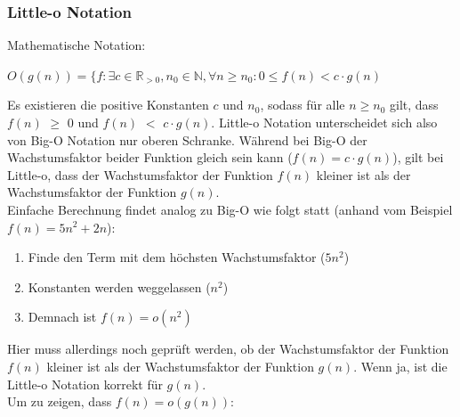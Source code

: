 \documentclass[
../AuD-Zusammenfassung.tex,
]
{subfiles}
\begin{document}
\newpage
\subsubsection{Little-o Notation}
Mathematische Notation:
\begin{center}
    $O(g(n)) = \{f: \exists c \in \mathbb{R}_{>0}, n_0 \in \mathbb{N}, \forall n \geq n_0:  0 \leq f(n) < c \cdot g(n)$
\end{center}
Es existieren die positive Konstanten $c$ und $n_0$, sodass für alle $n \geq n_0$ gilt, dass  $f(n)$ $\geq$  0 und $f(n)$ $<$ $c \cdot g(n)$. Little-o Notation unterscheidet sich also von Big-O Notation nur oberen Schranke. Während bei Big-O der Wachstumsfaktor beider Funktion gleich sein kann ($f(n) = c \cdot g(n)$), gilt bei Little-o, dass der Wachstumsfaktor der Funktion $f(n)$ kleiner ist als der Wachstumsfaktor der Funktion $g(n)$. \\
Einfache Berechnung findet analog zu Big-O wie folgt statt (anhand vom Beispiel $f(n) = 5n^2 + 2n$):
\begin{enumerate}
    \item Finde den Term mit dem höchsten Wachstumsfaktor ($5n^2$)
    \item Konstanten werden weggelassen ($n^2$)
    \item Demnach ist $f(n) = o(n^2)$
\end{enumerate}
Hier muss allerdings noch geprüft werden, ob der Wachstumsfaktor der Funktion $f(n)$ kleiner ist als der Wachstumsfaktor der Funktion $g(n)$. Wenn ja, ist die Little-o Notation korrekt für $g(n)$. \\
Um zu zeigen, dass $f(n) = o(g(n))$:
\end{document}
